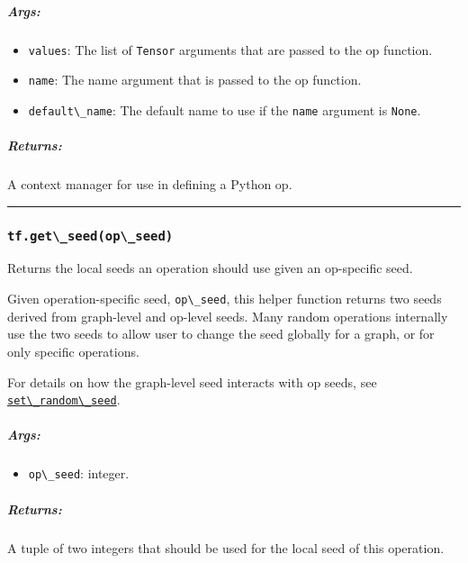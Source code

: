 \subparagraph{Args: }\label{args-43}

\begin{itemize}
\tightlist
\item
  \lstinline{values}: The list of \lstinline{Tensor} arguments that are passed
  to the op function.
\item
  \lstinline{name}: The name argument that is passed to the op function.
\item
  \lstinline{default\_name}: The default name to use if the \lstinline{name}
  argument is \lstinline{None}.
\end{itemize}

\subparagraph{Returns: }\label{returns-39}

A context manager for use in defining a Python op.

\begin{center}\rule{0.5\linewidth}{\linethickness}\end{center}

\subsubsection{\texorpdfstring{\lstinline{tf.get\_seed(op\_seed)}
}{tf.get\_seed(op\_seed) }}\label{tf.getux5fseedopux5fseed}

Returns the local seeds an operation should use given an op-specific
seed.

Given operation-specific seed, \lstinline{op\_seed}, this helper function
returns two seeds derived from graph-level and op-level seeds. Many
random operations internally use the two seeds to allow user to change
the seed globally for a graph, or for only specific operations.

For details on how the graph-level seed interacts with op seeds, see
\href{../../api_docs/python/constant_op.md\#set_random_seed}{\lstinline{set\_random\_seed}}.

\subparagraph{Args: }\label{args-44}

\begin{itemize}
\tightlist
\item
  \lstinline{op\_seed}: integer.
\end{itemize}

\subparagraph{Returns: }\label{returns-40}

A tuple of two integers that should be used for the local seed of this
operation.

